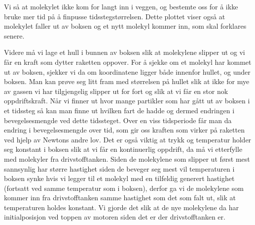 \documentclass[reprint,english,notitlepage]{revtex4-1}
\begin{document}
	Vi så at molekylet ikke kom for langt inn i veggen, og bestemte oss for å ikke
	bruke mer tid på å finpusse tidsstegstørrelsen. Dette plottet viser også at
	molekylet faller ut av boksen og et nytt molekyl kommer inn, som skal forklares
	senere.

	\vspace{0.5cm}

	Videre må vi lage et hull i bunnen av boksen slik at molekylene slipper ut og
	vi får en kraft som dytter raketten oppover. For å sjekke om et molekyl har kommet
	ut av boksen, sjekker vi da om koordinatene ligger både innenfor hullet, og under boksen.
	Man kan prøve seg litt fram med størrelsen på hullet slik at ikke for mye av gassen
	vi har tilgjengelig slipper ut for fort og slik at vi får en stor nok oppdriftskraft.
	Når vi finner ut hvor mange partikler som har gått ut av boksen i et tidssteg
	så kan man finne ut hvilken fart de hadde og dermed endringen i bevegelsesmengde
	ved dette tidssteget. Over en viss tidsperiode får man da endring i bevegelsesmengde over tid,
	som gir oss kraften som virker på raketten ved hjelp
	av Newtons andre lov. Det er også viktig at trykk og temperatur holder seg konstant
	i boksen slik at vi får en kontinuerlig oppdrift, da må vi etterfylle med molekyler
	fra drivstofftanken. Siden de molekylene som slipper ut først mest sannsynlig har
	større hastighet siden de beveger seg mest vil temperaturen i boksen synke hvis
	vi legger til et molekyl med en tilfeldig generert hastighet (fortsatt ved samme
  temperatur som i boksen), derfor ga vi de molekylene som kommer inn fra drivstofftanken
	samme hastighet som det som falt ut, slik at temperaturen holdes konstant. Vi gjorde det slik at de nye
	molekylene da har initialposisjon ved toppen av motoren siden det er der drivstofftanken er.
\end{document}
